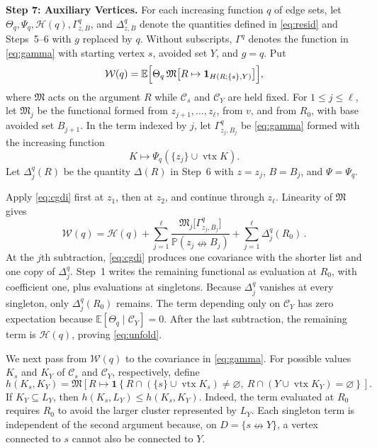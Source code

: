 \documentclass[11pt]{article}
\theoremstyle{definition}
\theoremstyle{remark}
\newcommand{\PP}{\mathbb P}
\newcommand{\EE}{\mathbb E}
\newcommand{\one}{\mathbf 1}
\newcommand{\ncon}{\nleftrightarrow}
\newcommand{\eC}{\mathcal C}
\DeclareMathOperator{\vtx}{vtx}
\newcommand{\Marg}{\mathfrak M}
\begin{document}
\medskip\noindent\textbf{Step 7: Auxiliary Vertices.}
For each increasing function $q$ of edge sets, let
$\Theta_q,\Psi_q,\mathcal H(q),\Gamma^q_{z,B}$, and $\Delta^q_{z,B}$ denote the quantities
defined in \eqref{eq:resid} and Steps~5--6 with $g$ replaced by $q$. Without subscripts,
$\Gamma^q$ denotes the function in \eqref{eq:gamma} with starting vertex $s$, avoided set
$Y$, and $g=q$. Put
\[
 \mathcal W(q)=\EE\Bigl[\Theta_q\,
   \Marg\bigl[R\mapsto\one_{H(R;\{s\},Y)}\bigr]\Bigr],
\]
where $\Marg$ acts on the argument $R$ while $\eC_s$ and $\eC_Y$ are held fixed. For
$1\leq j\leq\ell$, let $\Marg_j$ be the functional formed from
$z_{j+1},\ldots,z_\ell$, from $v$, and from $R_0$, with base avoided set $B_{j+1}$. In
the term indexed by $j$, let $\Gamma^q_{z_j,B_j}$ be \eqref{eq:gamma} formed with the
increasing function
\[
 K\longmapsto\Psi_q(\{z_j\}\cup\vtx K).
\]
Let $\Delta^q_j(R)$ be the quantity $\Delta(R)$ in Step~6 with $z=z_j$, $B=B_j$, and
$\Psi=\Psi_q$.

Apply \eqref{eq:cgdi} first at $z_1$, then at $z_2$, and continue through $z_\ell$.
Linearity of $\Marg$ gives
\begin{equation}\label{eq:unfold}
 \mathcal W(q)=\mathcal H(q)
 +\sum_{j=1}^{\ell}\frac{\Marg_j\bigl[\Gamma^q_{z_j,B_j}\bigr]}{\PP(z_j\ncon B_j)}
 +\sum_{j=1}^{\ell}\Delta^q_j(R_0)\,.
\end{equation}
At the $j$th subtraction, \eqref{eq:cgdi} produces one covariance with the shorter list
and one copy of $\Delta^q_j$. Step~1 writes the remaining functional as evaluation at
$R_0$, with coefficient one, plus evaluations at singletons. Because $\Delta^q_j$
vanishes at every singleton, only $\Delta^q_j(R_0)$ remains. The term depending only on
$\eC_Y$ has zero expectation because $\EE[\Theta_q\mid\eC_Y]=0$. After the last
subtraction, the remaining term is $\mathcal H(q)$, proving \eqref{eq:unfold}.

We next pass from $\mathcal W(q)$ to the covariance in \eqref{eq:gamma}. For possible
values $K_s$ and $K_Y$ of $\eC_s$ and $\eC_Y$, respectively, define
\[
 h(K_s,K_Y)=
 \Marg\!\left[
 R\mapsto
 \one\!\left\{
 R\cap(\{s\}\cup\vtx K_s)\neq\varnothing,\
 R\cap(Y\cup\vtx K_Y)=\varnothing
 \right\}\right].
\]
If $K_Y\subseteq L_Y$, then $h(K_s,L_Y)\leq h(K_s,K_Y)$. Indeed, the term evaluated at
$R_0$ requires $R_0$ to avoid the larger cluster represented by $L_Y$. Each singleton
term is independent of the second argument because, on $D=\{s\ncon Y\}$, a vertex
connected to $s$ cannot also be connected to $Y$.
\end{document}
